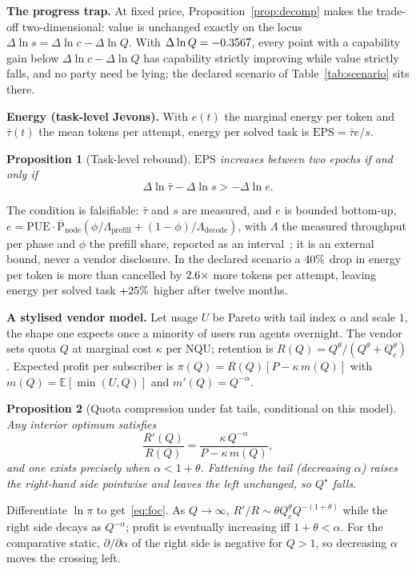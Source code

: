 \documentclass[conference]{IEEEtran}
\theoremstyle{plain}
\newtheorem{proposition}{Proposition}
\theoremstyle{definition}
\newcommand{\NQU}{\ensuremath{\mathrm{NQU}}}
\newcommand{\EPS}{\ensuremath{\mathrm{EPS}}}
\begin{document}
\textbf{The progress trap.} At fixed price, Proposition~\ref{prop:decomp}
makes the trade-off two-dimensional: value is unchanged exactly on the locus
$\Delta\ln s=\Delta\ln c-\Delta\ln Q$. With $\Delta\ln Q=-0.3567$, every
point with a capability gain below $\Delta\ln c-\Delta\ln Q$ has capability
strictly improving while value strictly falls, and no party need be lying; the
declared scenario of Table~\ref{tab:scenario} sits there.

\textbf{Energy (task-level Jevons).}
\label{sec:jevons}
With $e(t)$ the marginal energy per token and $\bar\tau(t)$ the mean tokens
per attempt, energy per solved task is $\EPS=\bar\tau e/s$.

\begin{proposition}[Task-level rebound]
\label{prop:jevons}
$\EPS$ increases between two epochs if and only if
\begin{equation}
\Delta\ln\bar\tau-\Delta\ln s>-\Delta\ln e .
\label{eq:jevons}
\end{equation}
\end{proposition}

The condition is falsifiable: $\bar\tau$ and $s$ are measured, and $e$ is
bounded bottom-up, $e=\mathrm{PUE}\cdot\overline{\mathrm{P}}_{\text{node}}
(\phi/\Lambda_{\text{prefill}}+(1-\phi)/\Lambda_{\text{decode}})$, with
$\Lambda$ the measured throughput per phase and $\phi$ the prefill share,
reported as an interval~\cite{samsi2023watts,luccioni2024powerhungry,%
henderson2020systematic}; it is an external bound, never a vendor disclosure.
In the declared scenario a $40\%$ drop in energy per token is more than
cancelled by $2.6\times$ more tokens per attempt, leaving energy per
solved task $+25\%$ higher after twelve months.

\textbf{A stylised vendor model.} Let usage $U$ be Pareto with tail index
$\alpha$ and scale $1$, the shape one expects once a minority of users run
agents overnight. The vendor sets quota $Q$ at marginal cost $\kappa$ per
\NQU; retention is $R(Q)=Q^\theta/(Q^\theta+Q_c^\theta)$. Expected profit per
subscriber is $\pi(Q)=R(Q)[P-\kappa\,m(Q)]$ with $m(Q)=\mathbb{E}[\min(U,Q)]$
and $m'(Q)=Q^{-\alpha}$.

\begin{proposition}[Quota compression under fat tails, conditional on this model]
\label{prop:vendor}
Any interior optimum satisfies
\begin{equation}
\frac{R'(Q)}{R(Q)}=\frac{\kappa\,Q^{-\alpha}}{P-\kappa\,m(Q)},
\label{eq:foc}
\end{equation}
and one exists precisely when $\alpha<1+\theta$. Fattening the tail
(decreasing $\alpha$) raises the right-hand side pointwise and leaves the
left unchanged, so $Q^\star$ falls.
\end{proposition}
\begin{IEEEproof}
Differentiate $\ln\pi$ to get~\eqref{eq:foc}. As $Q\to\infty$,
$R'/R\sim\theta Q_c^\theta Q^{-(1+\theta)}$ while the right side decays as
$Q^{-\alpha}$; profit is eventually increasing iff $1+\theta<\alpha$. For the
comparative static, $\partial/\partial\alpha$ of the right side is negative for
$Q>1$, so decreasing $\alpha$ moves the crossing left.
\end{IEEEproof}
\end{document}
